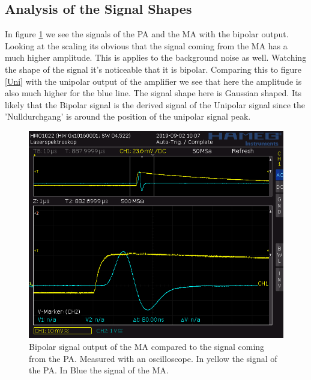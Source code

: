 \documentclass[30pt,a4paper]{article}
\begin{document}
 	\subsection{Analysis of the Signal Shapes}
 	In figure \ref{Bi} we see the signals of the PA and the MA with the bipolar output. Looking at the scaling its obvious that the signal coming from the MA has a much higher amplitude. This is applies to the background noise as well. Watching the shape of the signal it's noticeable that it is bipolar. Comparing this to figure \ref{Uni} with the unipolar output of the amplifier we see that here the amplitude is also much higher for the blue line. The signal shape here is Gaussian shaped. Its likely that the Bipolar signal is the derived signal of the Unipolar signal since the 'Nulldurchgang' is around the position of the unipolar signal peak.
 	\begin{figure}[h]
 		\includegraphics[scale=0.42]{Bilder/OsziBipolar}
 		\centering
 		\caption[Bipolar Signal]{Bipolar signal output of the MA compared to the signal coming from the PA. Measured with an oscilloscope. In yellow the signal of the PA. In Blue the signal of the MA.}
 		\label{Bi}
 	\end{figure}
\end{document}
